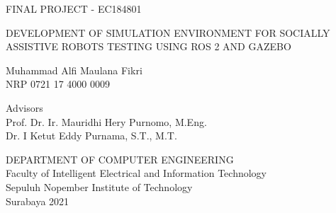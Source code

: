 FINAL PROJECT - EC184801

\vspace{6ex}

\begin{large}
  DEVELOPMENT OF SIMULATION ENVIRONMENT FOR SOCIALLY ASSISTIVE ROBOTS TESTING USING ROS 2 AND GAZEBO
\end{large}

\vspace{4ex}

Muhammad Alfi Maulana Fikri \\
NRP 0721 17 4000 0009

\vspace{2ex}

Advisors \\
Prof. Dr. Ir. Mauridhi Hery Purnomo, M.Eng. \\
Dr. I Ketut Eddy Purnama, S.T., M.T.

\vspace{6ex}

DEPARTMENT OF COMPUTER ENGINEERING \\
Faculty of Intelligent Electrical and Information Technology \\
Sepuluh Nopember Institute of Technology \\
Surabaya 2021
